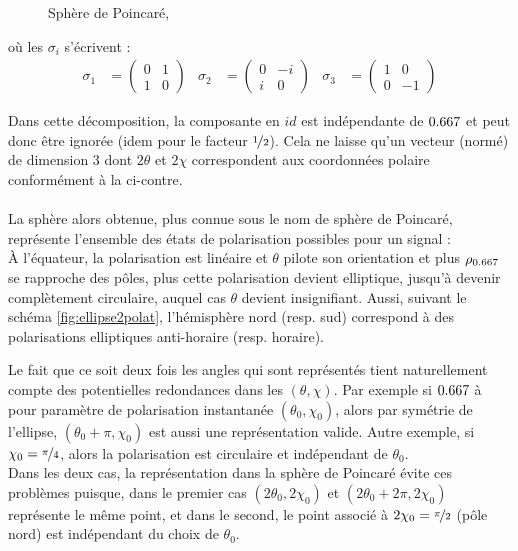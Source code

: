 \begin{figure}
	
	\caption{Sphère de Poincaré, }
	\label{fig:sphere2poincare}
\end{figure}

\par \noindent
où les $\sigma_i$ s'écrivent :
\begin{align*}
	\sigma_1 &= \begin{pmatrix} 0 & 1 \\ 1 &  0 \end{pmatrix}  &
	\sigma_2 &= \begin{pmatrix} 0 & -i \\  i &  0 \end{pmatrix}  &
	\sigma_3 &= \begin{pmatrix} 1 & 0 \\ 0 & -1 \end{pmatrix}
\end{align*}
\skipl

Dans cette décomposition, la composante en $id$ est indépendante de $\x$ et peut donc être ignorée (idem pour le facteur $\nicefrac{1}{2}$). Cela ne laisse qu'un vecteur (normé) de dimension 3 dont $2\theta$ et $2\chi$ correspondent aux coordonnées polaire conformément à la  ci-contre.
\\ 
\\
La sphère alors obtenue, plus connue sous le nom de sphère de Poincaré, représente l'ensemble des états de polarisation possibles pour un signal :
\\
À l'équateur, la polarisation est linéaire et $\theta$ pilote son orientation et plus $\rho_{\x}$ se rapproche des pôles, plus cette polarisation devient elliptique, jusqu'à devenir complètement circulaire, auquel cas $\theta$ devient insignifiant. 
Aussi, suivant le schéma \cref{fig:ellipse2polat}, l'hémisphère nord (resp. sud) correspond à des polarisations elliptiques anti-horaire (resp. horaire).

Le fait que ce soit deux fois les angles qui sont représentés tient naturellement compte des potentielles redondances dans les $(\theta,\chi)$. 
Par exemple si $\x$ à pour paramètre de polarisation instantanée $(\theta_0, \chi_0)$, alors par symétrie de l'ellipse, $(\theta_0+\pi, \chi_0)$ est aussi une représentation valide. Autre exemple, si $\chi_0 = \nicefrac{\pi}{4}$, alors la polarisation est circulaire et indépendant de $\theta_0$.
\\
Dans les deux cas, la représentation dans la sphère de Poincaré évite ces problèmes puisque, dans le premier cas $(2\theta_0, 2\chi_0)$ et $(2\theta_0+2\pi, 2\chi_0)$ représente le même point, et dans le second, le point associé à $2\chi_0=\nicefrac{\pi}{2}$ (pôle nord) est indépendant du choix de $\theta_0$.
\\

